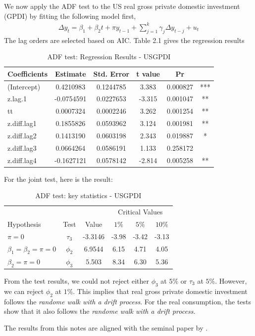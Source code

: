 \documentclass[12pt]{article}
\theoremstyle{definition}
\numberwithin{equation}{section}
\numberwithin{figure}{section}
\numberwithin{table}{section}
\begin{document}
We now apply the ADF test to the US real gross private domestic investment (GPDI) by fitting the following model first,
\begin{align*}
  \Delta y_t = \beta_1 + \beta_2 t + \pi y_{t-1} + \sum_{j=1}^k \gamma_j \Delta y_{t-j} + u_t
\end{align*}
The lag orders are selected based on AIC. Table 2.1 gives the regression results
\begin{table}[H]
  \renewcommand{\arraystretch}{1.2}
  \centering
  \caption{ADF test: Regression Results - USGPDI}
\begin{tabular}{lccccc}
  \hline
Coefficients & Estimate & Std. Error & t value & Pr \\
\hline
(Intercept)  & 0.4210983 & 0.1244785 &  3.383 & 0.000827 &***   \\
z.lag.1    & -0.0754591&  0.0227653 & -3.315 &0.001047 &**  \\
tt         &  0.0007324 & 0.0002246  & 3.262& 0.001254& **   \\
z.diff.lag1 & 0.1855826 & 0.0593962  & 3.124& 0.001981& **  \\
z.diff.lag2 & 0.1413190 & 0.0603198 &  2.343& 0.019887 & *   \\
z.diff.lag3  & 0.0664264 &  0.0586191 & 1.133 & 0.258172   \\
z.diff.lag4 & -0.1627121&  0.0578142 & -2.814 & 0.005258 & ** \\
\hline
\end{tabular}
\end{table}
For the joint test, here is the result:
\begin{table}[H]
  \renewcommand{\arraystretch}{1.2}
  \centering
  \caption{ADF test: key statistics - USGPDI}
  \begin{tabular}{lccccc}
    \hline
    \hline
    & & &  \multicolumn{3}{c}{Critical Values} \\
    \cline{4-6}
    Hypothesis & Test &  Value & $1\%$ & $5\%$ & $10\%$ \\
    $\pi = 0$ & $\tau_3$ & -3.3146 & -3.98 & -3.42 & -3.13 \\
    $\beta_1 = \beta_2 = \pi = 0$ & $\phi_2$ & 6.9544  & 6.15 & 4.71 & 4.05 \\
    $\beta_2 = \pi = 0$ & $\phi_3$ & 5.503  & 8.34 &  6.30 &  5.36 \\
    \hline
  \end{tabular}
\end{table}

From the test results, we could not reject either $\phi_3$ at $5\%$ or $\tau_3$ at $5\%$. However, we can reject $\phi_2$ at $1\%$. This implies that real gross private domestic investment follows the \textit{randome walk with a drift process}. For the real consumption, the tests show that it also follows the \textit{randome walk with a drift process}.

The results from this notes are aligned with the seminal paper by \cite{nelson1982trends}.

\newpage


\end{document}
